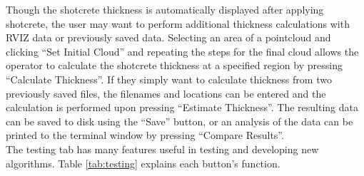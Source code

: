Though the shotcrete thickness is automatically displayed after applying shotcrete, the user may want to perform additional thickness calculations with RVIZ data or previously saved data. Selecting an area of a pointcloud and clicking ``Set Initial Cloud'' and repeating the steps for the final cloud allows the operator to calculate the shotcrete thickness at a specified region by pressing ``Calculate Thickness''. If they simply want to calculate thickness from two previously saved files, the filenames and locations can be entered and the calculation is performed upon pressing ``Estimate Thickness''. The resulting data can be saved to disk using the ``Save'' button, or an analysis of the data can be printed to the terminal window by pressing ``Compare Results''.\\

The testing tab has many features useful in testing and developing new algorithms. Table \ref{tab:testing} explains each button's function.\\
